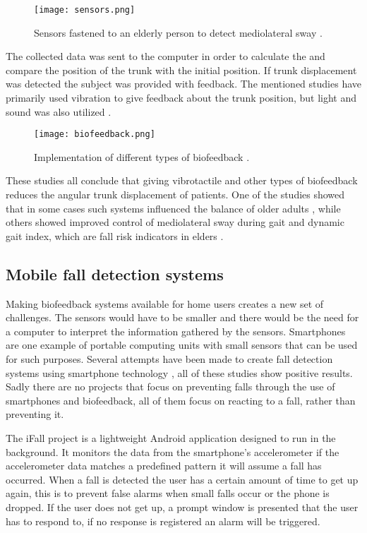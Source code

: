 \begin{figure}[h!]
  \centering
    \texttt{[image: sensors.png]}
    \caption{\footnotesize Sensors fastened to an elderly person to detect mediolateral sway \cite{vibrotactileTiltFeedback}.}
\end{figure}

The collected data was sent to the computer in order to calculate the and compare the position of the trunk with the initial position. If trunk displacement was detected the subject was provided with feedback. The mentioned studies have primarily used vibration to give feedback about the trunk position, but light and sound was also utilized \cite{multiModualBiofeedback}.

\begin{figure}[h!]
  \centering
    \texttt{[image: biofeedback.png]}
    \caption{\footnotesize Implementation of different types of biofeedback \cite{multiModualBiofeedback}.}
\end{figure}

These studies all conclude that giving vibrotactile and other types of biofeedback reduces the angular trunk displacement of patients. One of the studies showed that in some cases such systems influenced the balance of older adults \cite{multiModualBiofeedback}, while others showed improved control of mediolateral sway during gait and dynamic gait index, which are fall risk indicators in elders \cite{vibrotactileTiltFeedback}.

\subsection{Mobile fall detection systems}
Making biofeedback systems available for home users creates a new set of challenges. The sensors would have to be smaller and there would be the need for a computer to interpret the information gathered by the sensors. Smartphones are one example of portable computing units with small sensors that can be used for such purposes. Several attempts have been made to create fall detection systems using smartphone technology \cite{iFall, semiSupervisedFallDetection, mobilePhoneBasedFallDetection, detectionOfFalls}, all of these studies show positive results. Sadly there are no projects that focus on preventing falls through the use of smartphones and biofeedback, all of them focus on reacting to a fall, rather than preventing it.

The iFall \cite{iFall} project is a lightweight Android application designed to run in the background. It monitors the data from the smartphone’s accelerometer if the accelerometer data matches a predefined pattern it will assume a fall has occurred. When a fall is detected the user has a certain amount of time to get up again, this is to prevent false alarms when small falls occur or the phone is dropped. If the user does not get up, a prompt window is presented that the user has to respond to, if no response is registered an alarm will be triggered. 

